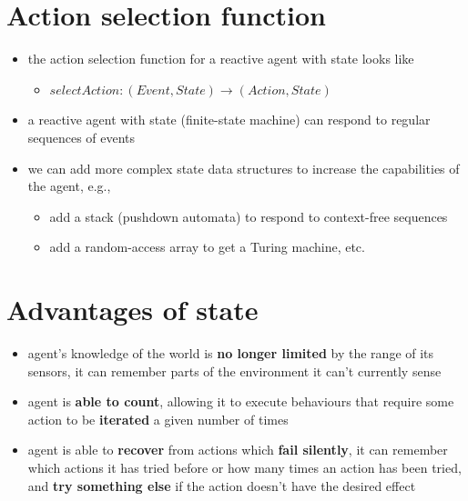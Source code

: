 \documentclass{article}
\begin{document}
\section{Action selection function}
\begin{itemize}
  \item the action selection function for a reactive agent with state looks like 
  \begin{itemize}
    \item $selectAction : (Event, State) \rightarrow (Action, State)$
  \end{itemize}
  \item a reactive agent with state (finite-state machine) can respond to regular sequences of events 
  \item we can add more complex state data structures to increase the capabilities of the agent, e.g.,
  \begin{itemize}
    \item add a stack (pushdown automata) to respond to context-free sequences 
    \item add a random-access array to get a Turing machine, etc.
  \end{itemize}
\end{itemize}

\section{Advantages of state}
\begin{itemize}
  \item agent’s knowledge of the world is \textbf{no longer limited} by the range of its sensors, it can remember parts of the environment it can’t currently sense 
  \item agent is \textbf{able to count}, allowing it to execute behaviours that require some action to be \textbf{iterated} a given number of times 
  \item agent is able to \textbf{recover} from actions which \textbf{fail silently}, it can remember which actions it has tried before or how many times an action has been tried, and \textbf{try something else} if the action doesn’t have the desired effect
\end{itemize}
\end{document}
